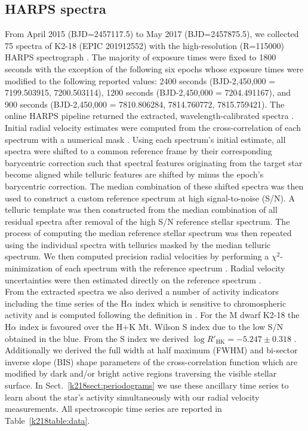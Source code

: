 \subsection{HARPS spectra}
From April 2015 (BJD=2457117.5) to May 2017 (BJD=2457875.5),
we collected 75 spectra of K2-18 (EPIC 201912552) with the high-resolution (R=115000)
HARPS spectrograph \citep{mayor03,pepe04}. The majority of exposure
times were fixed to 1800 seconds with the exception of the following six epochs
whose exposure times were modified to the following reported values: 2400 seconds
(BJD-2,450,000 = 7199.503915, 7200.503114), 1200 seconds (BJD-2,450,000 = 7204.491167),
and 900 seconds (BJD-2,450,000 = 7810.806284, 7814.760772, 7815.759421). 
The online HARPS pipeline returned the extracted, wavelength-calibrated
spectra \citep{lovis07}. Initial radial velocity estimates were computed
from the cross-correlation of each spectrum with 
a numerical mask \citep{baranne96, pepe02}.
Using each spectrum's initial estimate, all spectra were shifted to
a common reference frame by their corresponding barycentric correction such
that spectral features originating from the target star become aligned while
telluric features are shifted by minus the epoch's barycentric correction.
The median combination of these shifted spectra was then used to construct
a custom reference spectrum at high signal-to-noise (S/N). A telluric template was
then constructed from the median combination of all residual spectra after
removal of the high S/N reference stellar spectrum. The process of computing the
median reference stellar spectrum was then repeated using the individual spectra
with tellurics masked by the median telluric spectrum. 
We then computed precision radial velocities by performing a $\chi^2$-minimization
of each spectrum with the reference spectrum \citep{astudillodefru15}.
Radial velocity uncertainties were then estimated directly on the reference
spectrum \citep{bouchy01}. \\

From the extracted spectra we also derived a number of activity indicators including
the time series of the H$\alpha$ index which is sensitive to chromospheric activity and
is computed following the definition in \cite{bonfils07}. For the M dwarf K2-18
\citep[$V$=13.5;][]{henden14} the H$\alpha$ index is favoured over the \caii{} H+K
Mt. Wilson S index \citep{wilson68, baliunas95}
due to the low S/N obtained in the blue. From the S index we
derived $\log{R'_{\text{HK}}}=-5.247 \pm 0.318$ \citep{astudillodefru17a}. Additionally we derived
the full width at half maximum (FWHM) and bi-sector inverse slope (BIS)
shape parameters of the cross-correlation function which are modified
by dark and/or bright active regions traversing the visible stellar surface. In
Sect.~\ref{k218sect:periodograms} we use these ancillary time series to learn about
the star's activity simultaneously with our radial velocity measurements. 
All spectroscopic time series are reported in Table~\ref{k218table:data}.


